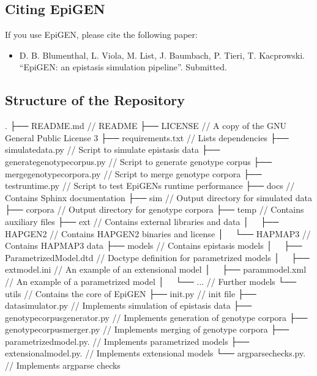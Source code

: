 \documentclass[a4paper,10pt,english]{sphinxhowto}
\begin{document}
\subsection{Citing EpiGEN}
\label{\detokenize{README:citing-epigen}}
If you use EpiGEN, please cite the following paper:
\begin{itemize}
\item {} 
D. B. Blumenthal, L. Viola, M. List, J. Baumbach, P. Tieri, T. Kacprowski. “EpiGEN: an epistasis simulation pipeline”. Submitted.

\end{itemize}


\subsection{Structure of the Repository}
\label{\detokenize{README:structure-of-the-repository}}
\begin{sphinxVerbatim}[commandchars=\\\{\}]
.
├── README.md                        // README
├── LICENSE                          // A copy of the GNU General Public License 3
├── requirements.txt                 // Lists dependencies
├── simulate\PYGZus{}data.py                 // Script to simulate epistasis data
├── generate\PYGZus{}genotype\PYGZus{}corpus.py      // Script to generate genotype corpus
├── merge\PYGZus{}genotype\PYGZus{}corpora.py        // Script to merge genotype corpora
├── test\PYGZus{}runtime.py                  // Script to test EpiGEN\PYGZsq{}s runtime performance
├── docs                             // Contains Sphinx documentation
├── sim                              // Output directory for simulated data
├── corpora                          // Output directory for genotype corpora
├── temp                             // Contains auxiliary files 
├── ext                              // Contains external libraries and data
│   ├── HAPGEN2                      // Contains HAPGEN2 binaries and license
│   └── HAPMAP3                      // Contains HAPMAP3 data
├── models                           // Contains epistasis models
│   ├── ParametrizedModel.dtd        // Doctype definition for parametrized models
│   ├── ext\PYGZus{}model.ini                // An example of an extensional model
│   ├── param\PYGZus{}model.xml              // An example of a parametrized model
│   └── ...                          // Further models
└── utils                            // Contains the core of EpiGEN
    ├── \PYGZus{}\PYGZus{}init\PYGZus{}\PYGZus{}.py                  // \PYGZus{}\PYGZus{}init\PYGZus{}\PYGZus{} file
    ├── data\PYGZus{}simulator.py            // Implements simulation of epistasis data
    ├── genotype\PYGZus{}corpus\PYGZus{}generator.py // Implements generation of genotype corpora
    ├── genotype\PYGZus{}corpusmerger.py     // Implements merging of genotype corpora
    ├── parametrized\PYGZus{}model.py.       // Implements parametrized models 
    ├── extensional\PYGZus{}model.py.        // Implements extensional models
    └── argparse\PYGZus{}checks.py.          // Implements argparse checks
\end{sphinxVerbatim}
\end{document}
